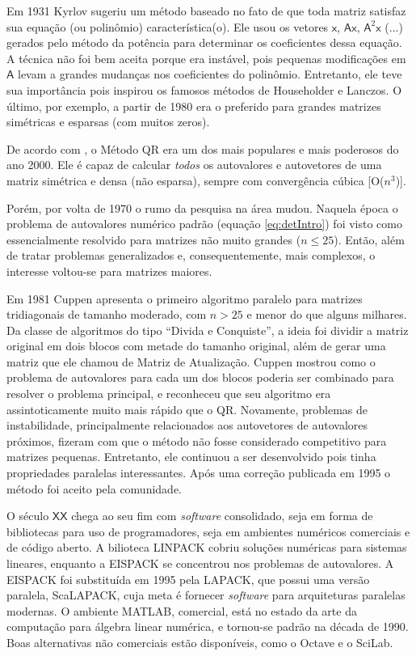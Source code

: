 	Em 1931 Kyrlov sugeriu um método baseado no fato de que toda matriz satisfaz sua equação (ou polinômio) característica(o). Ele usou os vetores $\mathsf{x}$, $\mathsf{A}\mathsf{x}$, $\mathsf{A}^2\mathsf{x}$ (...) gerados pelo método da potência para determinar os coeficientes dessa equação. A técnica não foi bem aceita porque era instável, pois pequenas modificações em $\mathsf{A}$ levam a grandes mudanças nos coeficientes do polinômio. Entretanto, ele teve sua importância pois inspirou os famosos métodos de Householder e Lanczos. O último, por exemplo, a partir de 1980 era o preferido para grandes matrizes simétricas e esparsas (com muitos zeros).
	
	 De acordo com \cite{autovaloresSecXX}, o Método QR era um dos mais populares e mais poderosos do ano 2000. Ele é capaz de calcular \emph{todos} os autovalores e autovetores de uma matriz simétrica e densa (não esparsa), sempre  com convergência cúbica [O($n^3$)].
	
	Porém, por volta de 1970 o rumo da pesquisa na área mudou. Naquela época o problema de autovalores numérico padrão (equação \ref{eq:detIntro}) foi visto como essencialmente resolvido para matrizes não muito grandes ($n \leq 25$). Então, além de tratar problemas generalizados e, consequentemente, mais complexos, o interesse voltou-se para matrizes maiores.
	
	Em 1981 Cuppen apresenta o primeiro algoritmo paralelo para matrizes tridiagonais de tamanho moderado, com $n > 25$ e menor do que alguns milhares. Da classe de algoritmos do tipo ``Divida e Conquiste'', a ideia foi dividir a matriz original em dois blocos com metade do tamanho original, além de gerar uma matriz que ele chamou de Matriz de Atualização. Cuppen mostrou como o problema de autovalores para cada um dos blocos poderia ser combinado para resolver o problema principal, e reconheceu que seu algoritmo era assintoticamente muito mais rápido que o QR. Novamente, problemas de instabilidade, principalmente relacionados aos autovetores de autovalores próximos, fizeram com que o método não fosse considerado competitivo para matrizes pequenas. Entretanto, ele continuou a ser desenvolvido pois tinha propriedades paralelas interessantes. Após uma correção publicada em 1995 o método foi aceito pela comunidade.
	
	O século $\mathsf{XX}$ chega ao seu fim com \emph{software} consolidado, seja em forma de bibliotecas para uso de programadores, seja em ambientes numéricos comerciais e de código aberto. A bilioteca LINPACK cobriu soluções numéricas para sistemas lineares, enquanto a EISPACK se concentrou nos problemas de autovalores. A EISPACK foi substituída em 1995 pela LAPACK, que possui uma versão paralela, ScaLAPACK, cuja meta é fornecer \emph{software} para arquiteturas paralelas modernas. O ambiente MATLAB, comercial, está no estado da arte da computação para álgebra linear numérica, e tornou-se padrão na década de 1990. Boas alternativas não comerciais estão disponíveis, como o Octave e o SciLab.
		
